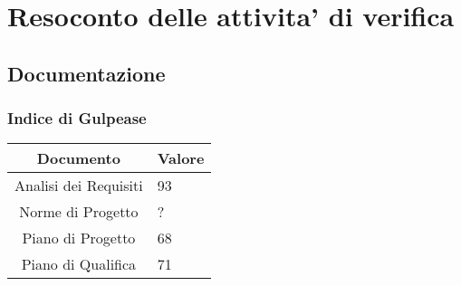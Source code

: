 \section{Resoconto delle attivita' di verifica}

\subsection{Documentazione}

\subsubsection{Indice di Gulpease}

\begin{table}[H]
	\centering
	\renewcommand\tabularxcolumn[1]{>{\Centering}m{#1}}
	\begin{tabularx}{\textwidth}{| c | X |} 
	\hline
	\textbf{Documento} & \textbf{Valore}\\
	\hline
	Analisi dei Requisiti & 93 \\
     	\hline
	Norme di Progetto & ?\\
	\hline
	Piano di Progetto & 68\\
	\hline
	Piano di Qualifica & 71\\
	\hline
	\end{tabularx}
\end{table}